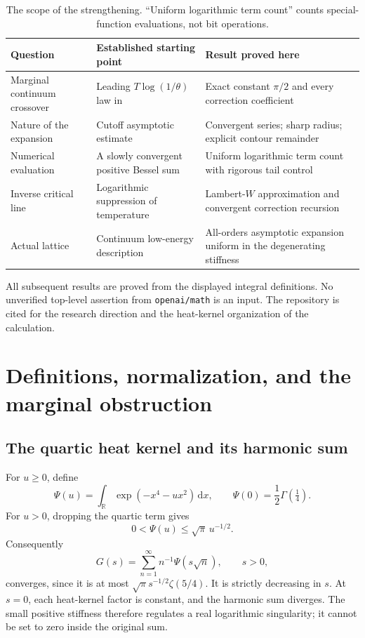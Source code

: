 \documentclass[11pt,a4paper]{article}
\numberwithin{equation}{section}
\theoremstyle{definition}
\newcommand{\R}{\mathbb R}
\newcommand{\dd}{\,\mathrm d}
\newcommand{\gfour}{\Gamma(\tfrac14)}
\begin{document}
\begin{table}[ht]
\centering\small
\begin{tabular}{>{\raggedright\arraybackslash}p{.27\linewidth}
>{\raggedright\arraybackslash}p{.29\linewidth}
>{\raggedright\arraybackslash}p{.34\linewidth}}
\toprule
Question & Established starting point & Result proved here\\
\midrule
Marginal continuum crossover & Leading $T\log(1/\theta)$ law in
\cite{LJ2020} & Exact constant $\pi/2$ and every correction coefficient\\[2mm]
Nature of the expansion & Cutoff asymptotic estimate & Convergent
series; sharp radius; explicit contour remainder\\[2mm]
Numerical evaluation & A slowly convergent positive Bessel sum &
Uniform logarithmic term count with rigorous tail control\\[2mm]
Inverse critical line & Logarithmic suppression of temperature &
Lambert-$W$ approximation and convergent correction recursion\\[2mm]
Actual lattice & Continuum low-energy description & All-orders
asymptotic expansion uniform in the degenerating stiffness\\
\bottomrule
\end{tabular}
\caption{The scope of the strengthening. ``Uniform logarithmic term count''
counts special-function evaluations, not bit operations.}
\label{tab:scope}
\end{table}

All subsequent results are proved from the displayed integral definitions.
No unverified top-level assertion from \texttt{openai/math} is an input.
The repository is cited for the research direction and the heat-kernel
organization of the calculation.

\section{Definitions, normalization, and the marginal obstruction}
\label{sec:setup}

\subsection{The quartic heat kernel and its harmonic sum}

For $u\ge0$, define
\begin{equation}
 \Psi(u)=\int_{\R}\exp(-x^4-u x^2)\dd x,
 \qquad \Psi(0)=\frac12\gfour.
 \label{eq:psi}
\end{equation}
For $u>0$, dropping the quartic term gives
\begin{equation}
 0<\Psi(u)\le\sqrt\pi\,u^{-1/2}.
 \label{eq:psibound}
\end{equation}
Consequently
\begin{equation}
 G(s)=\sum_{n=1}^{\infty}n^{-1}\Psi(s\sqrt n),\qquad s>0,
 \label{eq:G}
\end{equation}
converges, since it is at most
$\sqrt\pi s^{-1/2}\zeta(5/4)$. It is strictly decreasing in $s$.
At $s=0$, each heat-kernel factor is constant, and the harmonic sum
diverges. The small positive stiffness therefore regulates a real
logarithmic singularity; it cannot be set to zero inside the original sum.
\end{document}
